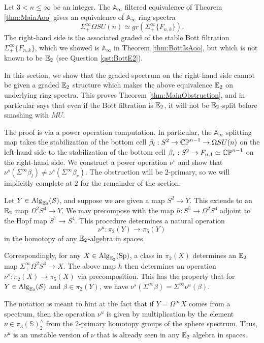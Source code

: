 

Let $3< n\leq \infty$ be an integer.  The $\mathbb{A}_{\infty}$ filtered equivalence of Theorem \ref{thm:MainAoo} gives an equivalence of $\mathbb{A}_\infty$ ring spectra  $$\Sigma^{\infty}_+ \Omega SU(n) \simeq gr(\Sigma^{\infty}_+ \{ F_{n,k} \}).$$  The right-hand side is the associated graded of the stable Bott filtration $\Sigma^{\infty}_+ \{ F_{n,k} \}$, which we showed is $\mathbb{A}_\infty$ in Theorem \ref{thm:BottIsAoo}, but which is not known to be $\operatorname{\mathbb{E}}_2$ (see Question \ref{qst:BottE2}).

In this section, we show that the graded spectrum on the right-hand side cannot be given a graded $\operatorname{\mathbb{E}}_2$ structure which makes the above equivalence $\operatorname{\mathbb{E}}_2$ on underlying ring spectra.  This proves Theorem \ref{thm:MainObstruction}, and in particular says that even if the Bott filtration is $\operatorname{\mathbb{E}}_2$, it will not be $\operatorname{\mathbb{E}}_2$-split before smashing with $MU$. 

The proof is via a power operation computation.  In particular, the $\mathbb{A}_\infty$ splitting map takes the stabilization of the bottom cell $\beta_l : S^2 \to  \operatorname{\mathbb{CP}}^{n-1} \to \Omega SU(n)$ on the left-hand side to the stabilization of the bottom cell $\beta_r: S^2 \to F_{n,1} \simeq \operatorname{\mathbb{CP}}^{n-1}$ on the right-hand side.  We construct a power operation $\nu^{s}$ and show that $\nu^{s}(\Sigma^{\infty} \beta_l) \neq \nu^s(\Sigma^{\infty} \beta_r).$  The obstruction will be $2$-primary, so we will implicitly complete at $2$ for the remainder of the section.  

\begin{obs}Let $Y\in \operatorname{\mathrm{Alg}}_{\operatorname{\mathbb{E}}_2}(\operatorname{\mathcal{S}})$, and suppose we are given a map $S^2\to Y$.  This extends to an $\operatorname{\mathbb{E}}_2$ map $\Omega^2 S^4 \to Y.$  We may precompose with the map $h: S^5 \to \Omega^2 S^4$ adjoint to the Hopf map $S^7\to S^4$.  This procedure determines a natural operation $$\nu^u: \pi_2(Y) \to \pi_5(Y)$$ in the homotopy of any $\operatorname{\mathbb{E}}_2$-algebra in spaces.  

Correspondingly, for any $X\in \operatorname{\mathrm{Alg}}_{\operatorname{\mathbb{E}}_2}(\operatorname{\mathrm{Sp}})$, a class in $\pi_2(X)$ determines an $\operatorname{\mathbb{E}}_2$ map $\Sigma^{\infty}_+ \Omega^2 S^4 \to X$.  The above map $h$ then determines an operation $\nu^s :\pi_2(X) \to \pi_5(X)$ via precomposition.  This has the property that for $Y\in \operatorname{\mathrm{Alg}}_{\operatorname{\mathbb{E}}_2}(\operatorname{\mathcal{S}})$ and $\beta \in \pi_2(Y)$, we have $\nu^s(\Sigma^{\infty} \beta) = \Sigma^{\infty} \nu^u (\beta).$
\end{obs}

\begin{rmk} \label{rmk:multnu}
The notation is meant to hint at the fact that if $Y = \Omega^\infty X$ comes from a spectrum, then the operation $\nu^u$ is given by multiplication by the element $\nu \in \pi_3(\mathbb{S})^{\wedge}_2$ from the $2$-primary homotopy groups of the sphere spectrum.  Thus, $\nu^u$ is an unstable version of $\nu$ that is already seen in any $\operatorname{\mathbb{E}}_2$ algebra in spaces.    %
\end{rmk}

